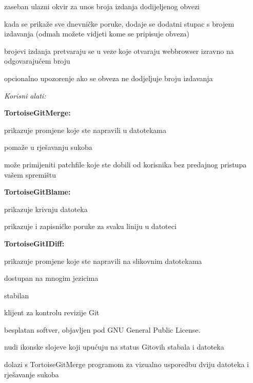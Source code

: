 \begin{frame}[allowframebreaks]
\begin{itemize}
 \item zaseban ulazni okvir za unos broja izdanja dodijeljenog obvezi 
 \item kada se prikaže sve dnevničke poruke, dodaje se dodatni stupac s brojem izdavanja (odmah možete vidjeti kome se pripisuje obveza)
 \item brojevi izdanja pretvaraju se u veze koje otvaraju webbrowser izravno na odgovarajućem broju
 \item opcionalno upozorenje ako se obveza ne dodjeljuje broju izdavanja
 \framebreak
\item \textit{Korisni alati:}
 \item \textbf{TortoiseGitMerge:}
 {\setlength\itemindent{15pt}\item prikazuje promjene koje ste napravili u datotekama}
 {\setlength\itemindent{15pt}\item pomaže u rješavanju sukoba}
 {\setlength\itemindent{15pt}\item može primijeniti patchfile koje ste dobili od korisnika bez predajnog pristupa vašem spremištu}
 \item \textbf{TortoiseGitBlame:}
 {\setlength\itemindent{15pt}\item prikazuje krivnju datoteka}
 {\setlength\itemindent{15pt}\item prikazuje i zapisničke poruke za svaku liniju u datoteci}
 \item \textbf{TortoiseGitIDiff:}
 {\setlength\itemindent{15pt}\item prikazuje promjene koje ste napravili na slikovnim datotekama}
 \framebreak
 \item dostupan na mnogim jezicima
 \item stabilan
 \item klijent za kontrolu revizije Git
 \item besplatan softver, objavljen pod GNU General Public License.
 \item nudi ikonske slojeve koji upućuju na status Gitovih stabala i datoteka
 \item dolazi s TortoiseGitMerge programom za vizualno usporedbu dviju datoteka i rješavanje sukoba
\end{itemize}
\end{frame}
